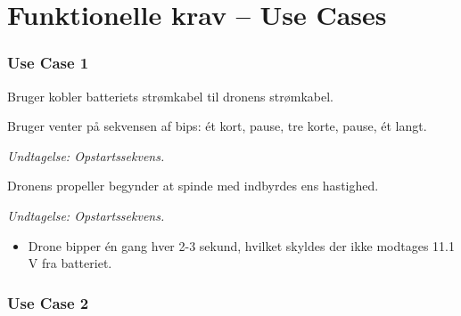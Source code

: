 \documentclass[Main]{subfiles}
\begin{document}
\chapter{Funktionelle krav -- Use Cases}\label{Sec:chap3}


\subsection{Use Case 1}

\begin{UseCase}

	\begin{normFor}
	\item Bruger kobler batteriets strømkabel til dronens strømkabel.
	\item Bruger venter på sekvensen af bips: ét kort, pause, tre korte, pause, ét langt.
	\item[]	\textit{Undtagelse: Opstartssekvens.}
	\item Dronens propeller begynder at spinde med indbyrdes ens hastighed.
	\end{normFor} 

	\begin{normFor}
	\item \textit{Undtagelse: Opstartssekvens.}
	\begin{itemize}
	\item Drone bipper én gang hver 2-3 sekund, hvilket skyldes der ikke modtages 11.1 V fra batteriet.
	\end{itemize}
	\end{normFor} 
\end{UseCase}



\subsection{Use Case 2}
\end{document}
